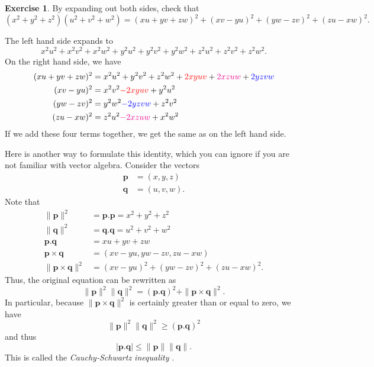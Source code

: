 \documentclass[a4paper]{book}
\newcommand{\RED}[1]{{\color{red}#1}}
\newcommand{\BLUE}[1]{{\color{blue}#1}}
\newcommand{\PURPLE}[1]{{\color{purple}#1}}
\newcommand{\MAGENTA}[1]{{\color{magenta}#1}}
\newcommand{\tm}        {\times}
\newcommand{\vp}        {\mathbf{p}}
\newcommand{\vq}        {\mathbf{q}}
\renewcommand{\:}{\colon}
\newcommand{\mathworld}[1]{}
\newcommand{\DEFN}[1]{\PURPLE{\emph{#1}}}
\theoremstyle{definition}
\newtheorem{exercise}[theorem]{Exercise}
\renewenvironment{solution}{\SolutionInline}{\endSolutionInline}
\begin{document}
\begin{exercise}
 By expanding out both sides, check that
 \[ (x^2+y^2+z^2)(u^2+v^2+w^2) =
    (xu+yv+zw)^2 + (xv-yu)^2 + (yw-zv)^2 + (zu-xw)^2.
 \]
\end{exercise}
\begin{solution}
 The left hand side expands to
 \[ x^2u^2 + x^2v^2 + x^2w^2 +
    y^2u^2 + y^2v^2 + y^2w^2 +
    z^2u^2 + z^2v^2 + z^2w^2.
 \]
 On the right hand side, we have
 \begin{align*}
  (xu+yv+zw)^2 &= x^2u^2 + y^2v^2 + z^2w^2 +
                  \RED{     2xyuv} +
                  \MAGENTA{ 2xzuw} +
                  \BLUE{    2yzvw} \\
  (xv-yu)^2    &= x^2v^2
                  \RED{ -2xyuv}
                  + y^2u^2 \\
  (yw-zv)^2    &= y^2w^2
                  \BLUE{ -2yzvw}
                  + z^2v^2 \\
  (zu-xw)^2    &= z^2u^2
                  \MAGENTA{ -2xzuw}
                  + x^2w^2
 \end{align*}
 If we add these four terms together, we get the same as on the left
 hand side.

 Here is another way to formulate this identity, which you can ignore
 if you are not familiar with vector algebra.  Consider the vectors
 \begin{align*}
  \vp &= (x,y,z) \\
  \vq &= (u,v,w).
 \end{align*}
 Note that
 \begin{align*}
  \|\vp\|^2 &= \vp.\vp = x^2 + y^2 + z^2 \\
  \|\vq\|^2 &= \vq.\vq = u^2 + v^2 + w^2 \\
  \vp.\vq   &= xu + yv + zw \\
  \vp\tm\vq &= (xv-yu, yw-zv, zu-xw) \\
  \|\vp\tm\vq\|^2 &= (xv-yu)^2 + (yw-zv)^2 + (zu-xw)^2.
 \end{align*}
 Thus, the original equation can be rewritten as
 \[ \|\vp\|^2 \|\vq\|^2 = (\vp.\vq)^2 + \|\vp\tm\vq\|^2. \]
 In particular, because $\|\vp\tm\vq\|^2$ is certainly greater than or
 equal to zero, we have
 \[ \|\vp\|^2 \|\vq\|^2 \geq (\vp.\vq)^2 \]
 and thus
 \[ |\vp.\vq| \leq \|\vp\| \|\vq\|. \]
 This is called the \DEFN{Cauchy-Schwartz inequality}
 \mathworld{CauchysInequality}.
\end{solution}
\end{document}

